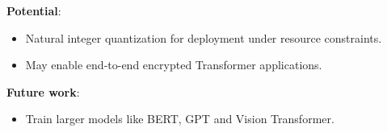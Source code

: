 \documentclass[12pt,oneside]{book}
\begin{document}
\begin{framed}
\noindent
\textbf{Potential}: 
\begin{itemize}
    \item Natural integer quantization for deployment under resource constraints.
    \item May enable end-to-end encrypted Transformer applications.
\end{itemize}

\noindent
\textbf{Future work}: 
\begin{itemize}
    \item Train larger models like BERT, GPT and Vision Transformer.
\end{itemize}

\end{framed}
 
\end{document}
